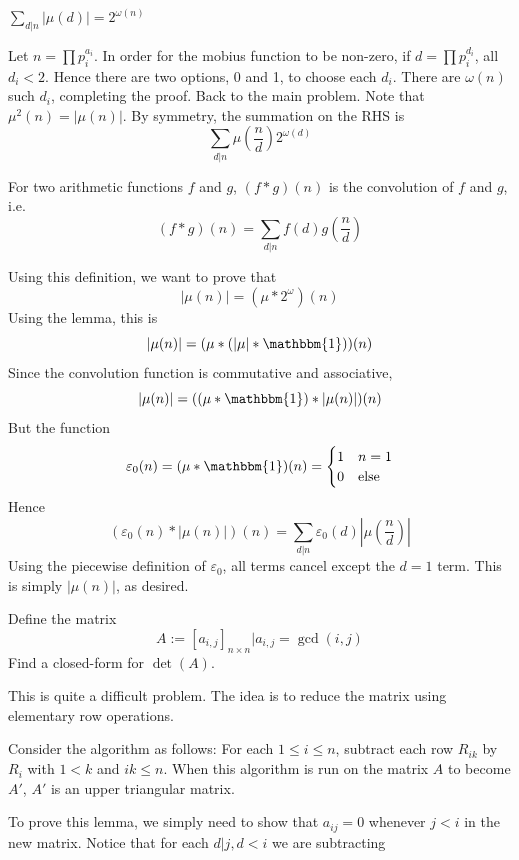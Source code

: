 \documentclass[11pt]{scrartcl}
\begin{document}
\begin{soln}
  \begin{lemma}
    $\sum_{d|n}|\mu(d)|=2^{\omega(n)}$
  \end{lemma}
  Let $n=\prod p_i^{a_i}$. In order for the mobius function to be
  non-zero, if $d=\prod p_i^{d_i}$, all $d_i<2$. Hence there are two options,
  0 and 1, to choose each $d_i$. There are $\omega(n)$ such $d_i$, completing
  the proof.
  \newline \newline
  Back to the main problem. Note that $\mu^2(n)=|\mu(n)|$.
  By symmetry, the summation on the RHS is
  $$\sum_{d|n}\mu\left(\frac{n}{d}\right)2^{\omega(d)}$$
  \begin{definition}
    For two arithmetic functions $f$ and $g$, $(f*g)(n)$ is the convolution
    of $f$ and $g$, i.e.
    $$(f*g)(n)=\sum_{d|n}f(d)g\left(\frac{n}{d}\right)$$
  \end{definition}
  \noindent Using this definition, we want to prove that
  $$|\mu(n)|=(\mu * 2^{\omega})(n)$$
  Using the lemma, this is
  $$|\mu(n)|=(\mu * (|\mu|*\mathbbm{1}))(n)$$
  Since the convolution function is commutative and associative,
  $$|\mu(n)|=((\mu*\mathbbm{1})*|\mu(n)|)(n)$$
  But the function
  $$\varepsilon_0(n)=(\mu*\mathbbm{1})(n)=\begin{cases}1 & n=1 \\ 0 & \mathrm{else}\end{cases}$$
    Hence
    $$(\varepsilon_0(n)*|\mu(n)|)(n)=\sum_{d|n}\varepsilon_0(d)|\mu\left(\frac{n}{d}\right)|$$
    Using the piecewise definition of $\varepsilon_0$, all terms cancel except the $d=1$ term.
    This is simply $|\mu(n)|$, as desired.
\end{soln}
\begin{example}
  Define the matrix
  $$A:=[a_{i,j}]_{n\times n}|a_{i,j}=\gcd(i,j)$$
  Find a closed-form for $\det(A)$.
\end{example}
This is quite a difficult problem. The idea is to reduce the matrix using elementary row operations.
\begin{lemma}
  Consider the algorithm as follows: For each $1\le i\le n$, subtract each row $R_{ik}$ by $R_i$ with $1<k$ and $ik\le n$.
  When this algorithm is run on the matrix $A$ to become $A'$, $A'$ is an upper triangular matrix.
\end{lemma}
To prove this lemma, we simply need to show that $a_{ij}=0$ whenever $j<i$ in the new matrix. Notice that for each $d|j, d<i$ we are subtracting
\end{document}
